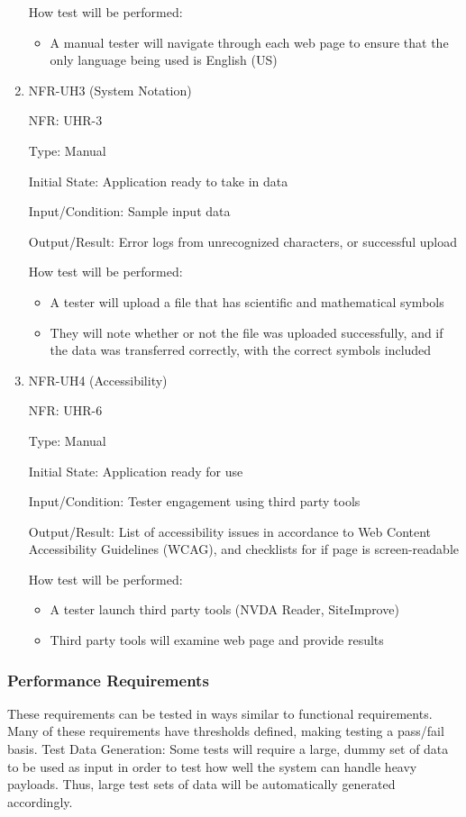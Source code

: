 \documentclass[12pt, titlepage]{article}
\begin{document}
\begin{enumerate}
  How test will be performed:
  \begin{itemize}
    \item A manual tester will navigate through each web page to ensure that the
    only language being used is English (US)  
  \end{itemize}

  \item{NFR-UH3 (System Notation)\\}

  NFR: UHR-3

  Type: Manual

  Initial State: Application ready to take in data

  Input/Condition: Sample input data

  Output/Result: Error logs from unrecognized characters, or successful upload
  
  How test will be performed:
  \begin{itemize}
    \item A tester will upload a file that has scientific and mathematical
    symbols
    \item They will note whether or not the file was uploaded successfully, and
    if the data was transferred correctly, with the correct symbols included
  \end{itemize}

  \item{NFR-UH4 (Accessibility)\\}

  NFR: UHR-6
  
  Type: Manual
  
  Initial State: Application ready for use
  
  Input/Condition: Tester engagement using third party tools
  
  Output/Result: List of accessibility issues in accordance to Web Content
  Accessibility Guidelines (WCAG), and checklists for if page is screen-readable
  
  How test will be performed:
  \begin{itemize}
    \item A tester launch third party tools (NVDA Reader, SiteImprove)
    \item Third party tools will examine web page and provide results
    \end{itemize}
  \end{enumerate}

\subsubsection{Performance Requirements}
These requirements can be tested in ways similar to functional requirements.
Many of these requirements have thresholds defined, making testing a pass/fail
basis. \newline \newline
Test Data Generation: Some tests will require a large, dummy set of data to be
used as input in order to test how well the system can handle heavy payloads.
Thus, large test sets of data will be automatically generated accordingly.
\end{document}
